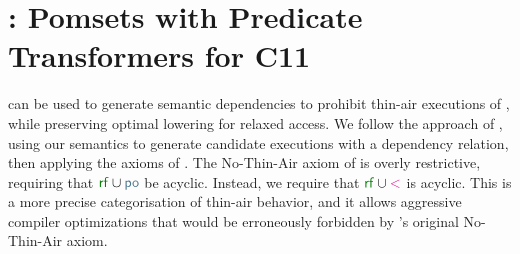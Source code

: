 \section{\PwTcTITLE: Pomsets with Predicate Transformers for C11}
\label{sec:c11}


\PwT{} can be used to generate semantic dependencies to prohibit thin-air
executions of \cXI, while preserving optimal lowering for relaxed access.  We
follow the approach of \citet{DBLP:conf/esop/PaviottiCPWOB20}, using our
semantics to generate \cXI{} candidate executions with a dependency relation,
then applying the axioms of \rcXI{} \cite{DBLP:conf/pldi/LahavVKHD17}.  The
No-Thin-Air axiom of \rcXI{} is overly restrictive, requiring that
${\rrfx}\cup{\rpox}$ be acyclic.  Instead, we require that ${\rrfx}\cup{\lt}$
is acyclic.  This is a more precise categorisation of thin-air behavior, and 
it allows aggressive compiler optimizations that would be erroneously forbidden
by \rcXI's original No-Thin-Air axiom.

